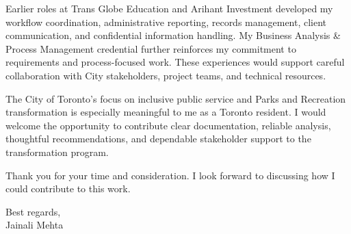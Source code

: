 \documentclass[letterpaper,10pt]{article}
\begin{document}
Earlier roles at Trans Globe Education and Arihant Investment developed my workflow coordination, administrative reporting, records management, client communication, and confidential information handling. My Business Analysis \& Process Management credential further reinforces my commitment to requirements and process-focused work. These experiences would support careful collaboration with City stakeholders, project teams, and technical resources.

The City of Toronto's focus on inclusive public service and Parks and Recreation transformation is especially meaningful to me as a Toronto resident. I would welcome the opportunity to contribute clear documentation, reliable analysis, thoughtful recommendations, and dependable stakeholder support to the transformation program.

Thank you for your time and consideration. I look forward to discussing how I could contribute to this work.

Best regards,\\[8pt]
Jainali Mehta
\end{document}
